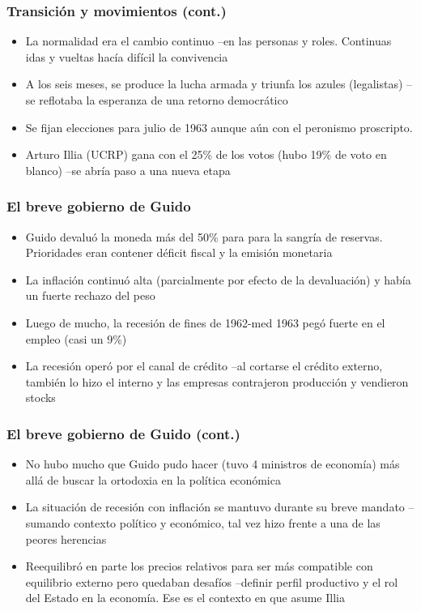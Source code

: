 \documentclass[14pt,aspectratio=169]{beamer}
\begin{document}
  \begin{frame}\frametitle{Transición y movimientos (cont.)}
    \begin{itemize}\itemsep 10pt
    \item La normalidad era el cambio continuo --en las personas y
      roles. Continuas idas y vueltas hacía difícil la convivencia
      \item A los seis meses, se produce la lucha armada y triunfa los
        azules (legalistas) --se reflotaba la esperanza de una retorno
        democrático
        \item Se fijan elecciones para julio de 1963 aunque aún con el
          peronismo proscripto.
          \item Arturo Illia (UCRP) gana con el 25\% de los votos (hubo 19\%
            de voto en blanco) --se abría paso a una nueva etapa
        \end{itemize}
               \end{frame}



  \begin{frame}\frametitle{El breve gobierno de Guido}
    \begin{itemize}\itemsep 10pt
    \item Guido devaluó la moneda más del 50\% para para la sangría de
      reservas. Prioridades eran contener déficit fiscal y la emisión
      monetaria
      \item La inflación continuó alta (parcialmente por efecto de la
        devaluación) y había un fuerte rechazo del peso
        \item Luego de mucho, la recesión de fines de
          1962-med 1963 pegó fuerte en el empleo (casi un 9\%)
          \item La recesión operó por el canal de crédito --al
            cortarse el crédito externo, también lo hizo el interno y
            las empresas contrajeron producción y vendieron stocks
        \end{itemize}
               \end{frame}


\begin{frame}\frametitle{El breve gobierno de Guido (cont.)}
    \begin{itemize}\itemsep 10pt
    \item No hubo mucho que Guido pudo hacer (tuvo 4 ministros de
      economía) más allá de buscar la ortodoxia en la política
      económica
      \item La situación de recesión con inflación se mantuvo durante
        su breve mandato --sumando contexto político y económico, tal
        vez hizo frente a una de las peores herencias
        \item Reequilibró en parte los precios relativos para ser más
          compatible con equilibrio externo pero quedaban desafíos
          --definir perfil productivo y el rol del Estado en la
          economía. Ese es el contexto en que asume Illia
        \end{itemize}
               \end{frame}
               
\end{document}
